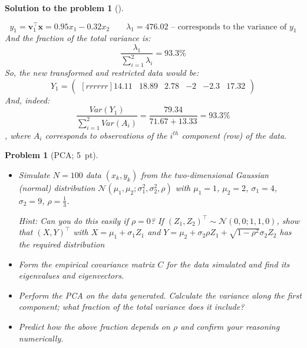 \documentclass[12pt,a4]{article}
\newtheorem{problem}{Problem}
\newtheorem{solution}{Solution to the problem}
\newcommand{\bv}{{\mathbf v}}
\newcommand{\bx}{{\mathbf x}}
\begin{document}
\begin{solution}[]
\begin{enumerate}[(a)]
 \[
 y_1 = \bv_1^\top \bx = 0.95 x_1 - 0.32 x_2
 \qquad
 \lambda_1 = 476.02 \text{ -- corresponds to the variance of $y_1$}
 \]
 And the fraction of the total variance is:
 \[
 \frac{\lambda_1}{\sum_{i=1}^2 \lambda_i} = 93.3\%
 \]
 So, the new transformed and restricted data would be:
 \[
Y_1 = \begin{pmatrix}[rrrrrr]
14.11 & 18.89 & 2.78 & -2 & -2.3 & 17.32
\end{pmatrix}
 \]
And, indeed:
\[
\frac{Var(Y_1)}{\sum_{i=1}^2 Var(A_i)} = \frac{79.34}{71.67+13.33} = 93.3\%
\]
, where $A_i$ corresponds to observations of the $i^{th}$ component (row) of the data.\\
\end{enumerate}
\end{solution}



\begin{problem}[PCA; 5~pt]\label{prb:PCA}\rm
	\begin{itemize}
		\item[(a)] Simulate $N=100$ data $(x_k,y_k)$ from the two-dimensional Gaussian (normal) distribution $\mathcal{N}(\mu_1,\mu_2; \sigma_1^2,\sigma_2^2, \rho)$ with $\mu_1 = 1$, $\mu_2 = 2$, $\sigma_1 = 4$, $\sigma_2 = 9$, $\rho=\tfrac13$.
		
		\small{\textsf{Hint: Can you do this easily if $\rho = 0$? If $(Z_1,Z_2)^\top \sim \mathcal{N}(0,0; 1,1, 0)$, show that $(X,Y)^\top$ with $X = \mu_1+ \sigma_1 Z_1$ and $Y = \mu_2 + \sigma_2\rho Z_1 + \sqrt{1-\rho^2}\sigma_2Z_2$ has the required distribution}}
		
		\item[(b)] Form the empirical covariance matrix $C$ for the data simulated and find its eigenvalues and eigenvectors.
		
		\item[(c)] Perform the PCA on the data generated. Calculate the variance along the first component; what fraction of the total variance does it include?
		
		\item[(d)] Predict how the above fraction depends on $\rho$ and confirm your reasoning numerically.
	\end{itemize}
\end{problem}
\end{document}
